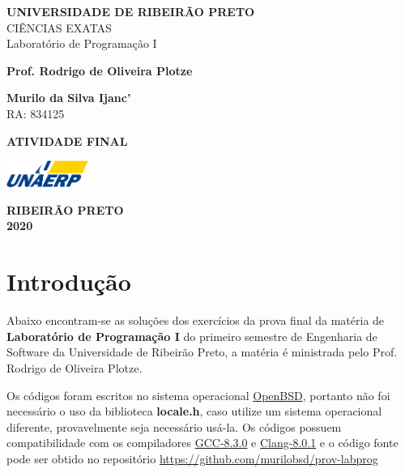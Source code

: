 \documentclass[12pt,a4paper]{article}
\let\oldsection\section
\renewcommand\section{\clearpage\oldsection}
\begin{document}
\begin{titlepage}
	\begin{center}
		\textbf{UNIVERSIDADE DE RIBEIRÃO PRETO} \\
			CIÊNCIAS EXATAS \\
			Laboratório de Programação I

			\vspace{1.5cm}

			\textbf{Prof. Rodrigo de Oliveira Plotze}

			\vspace{0.5cm}

			\textbf{Murilo da Silva Ijanc'} \\
			RA: 834125

			\vspace{6.5cm}

			\textbf{ATIVIDADE FINAL}

			\vfill

			\vspace{0.8cm}

			\includegraphics[width=0.2\textwidth]{unaerp}

			\textbf{RIBEIRÃO PRETO} \\
			\textbf{2020}
	\end{center}
\end{titlepage}

\thispagestyle{empty}
\tableofcontents

\newpage
\thispagestyle{empty}

\listoffigures
\newpage


\section{Introdução}
Abaixo encontram-se as soluções dos exercícios da prova final da matéria
de \textbf{Laboratório de Programação I} do primeiro semestre de Engenharia
de Software da Universidade de Ribeirão Preto, a matéria é ministrada pelo
Prof. Rodrigo de Oliveira Plotze.

Os códigos foram escritos no sistema operacional
\href{https://www.openbsd.org}{OpenBSD}, portanto não foi necessário o uso
da biblioteca \textbf{locale.h}, caso utilize um sistema operacional diferente,
provavelmente seja necessário usá-la. Os códigos possuem compatibilidade com os 
compiladores \href{https://gcc.gnu.org/}{GCC-8.3.0} e 
\href{https://clang.llvm.org/}{Clang-8.0.1} e o código fonte pode ser obtido no
repositório \url{https://github.com/murilobsd/prov-labprog}
\end{document}
